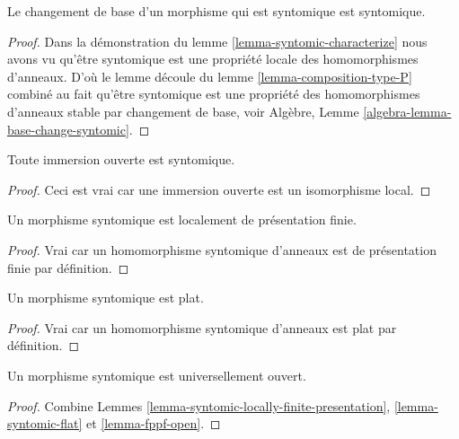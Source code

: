 \begin{lemma}
\label{lemma-base-change-syntomic}
Le changement de base d'un morphisme qui est syntomique est syntomique.
\end{lemma}

\begin{proof}
Dans la démonstration du lemme \ref{lemma-syntomic-characterize} nous avons
vu qu'être syntomique est une propriété locale des homomorphismes
d'anneaux. D'où
le lemme découle du lemme \ref{lemma-composition-type-P} combiné
au fait qu'être syntomique est une propriété des homomorphismes
d'anneaux stable par
changement de base, voir Algèbre, Lemme \ref{algebra-lemma-base-change-syntomic}.
\end{proof}

\begin{lemma}
\label{lemma-open-immersion-syntomic}
Toute immersion ouverte est syntomique.
\end{lemma}

\begin{proof}
Ceci est vrai car une immersion ouverte est un isomorphisme local.
\end{proof}

\begin{lemma}
\label{lemma-syntomic-locally-finite-presentation}
Un morphisme syntomique est localement de présentation finie.
\end{lemma}

\begin{proof}
Vrai car un homomorphisme syntomique d'anneaux est de présentation finie par
définition.
\end{proof}

\begin{lemma}
\label{lemma-syntomic-flat}
Un morphisme syntomique est plat.
\end{lemma}

\begin{proof}
Vrai car un homomorphisme syntomique d'anneaux est plat par définition.
\end{proof}

\begin{lemma}
\label{lemma-syntomic-open}
Un morphisme syntomique est universellement ouvert.
\end{lemma}

\begin{proof}
Combine
Lemmes \ref{lemma-syntomic-locally-finite-presentation},
\ref{lemma-syntomic-flat} et
\ref{lemma-fppf-open}.
\end{proof}

